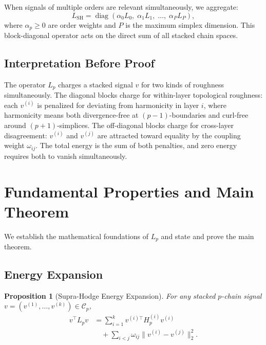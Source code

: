 \documentclass[11pt]{article}
\newtheorem{proposition}[theorem]{Proposition}
\theoremstyle{definition}
\theoremstyle{remark}
\newcommand{\LSH}{L_{\mathrm{SH}}}
\newcommand{\calC}{\mathcal{C}}
\DeclareMathOperator{\diag}{diag}
\begin{document}
When signals of multiple orders are relevant simultaneously, we aggregate:
\[
  \LSH = \diag(\alpha_0 L_0,\; \alpha_1 L_1,\; \dots,\; \alpha_P L_P),
\]
where $\alpha_p\geq 0$ are order weights and $P$ is the maximum simplex
dimension. This block-diagonal operator acts on the direct sum of all
stacked chain spaces.

\subsection{Interpretation Before Proof}

The operator $L_p$ charges a stacked signal $v$ for two kinds of roughness
simultaneously. The diagonal blocks charge for within-layer topological
roughness: each $v^{(i)}$ is penalized for deviating from harmonicity in layer
$i$, where harmonicity means both divergence-free at $(p-1)$-boundaries and
curl-free around $(p+1)$-simplices. The off-diagonal blocks charge for
cross-layer disagreement: $v^{(i)}$ and $v^{(j)}$ are attracted toward
equality by the coupling weight $\omega_{ij}$. The total energy is the sum of
both penalties, and zero energy requires both to vanish simultaneously.


\section{Fundamental Properties and Main Theorem}
\label{sec:properties}

We establish the mathematical foundations of $L_p$ and state and prove the
main theorem.

\subsection{Energy Expansion}

\begin{proposition}[Supra-Hodge Energy Expansion]
\label{prop:sh_energy}
For any stacked $p$-chain signal $v=(v^{(1)},\dots,v^{(k)})\in\calC_p$,
\begingroup
\small
\[
  \begin{aligned}
    v^\top L_p v
    &= \sum_{i=1}^k v^{(i)\top}H_p^{(i)}v^{(i)} \\
    &\quad + \sum_{i<j}\omega_{ij}\|v^{(i)}-v^{(j)}\|_2^2.
  \end{aligned}
\]
\endgroup
\end{proposition}
\end{document}
